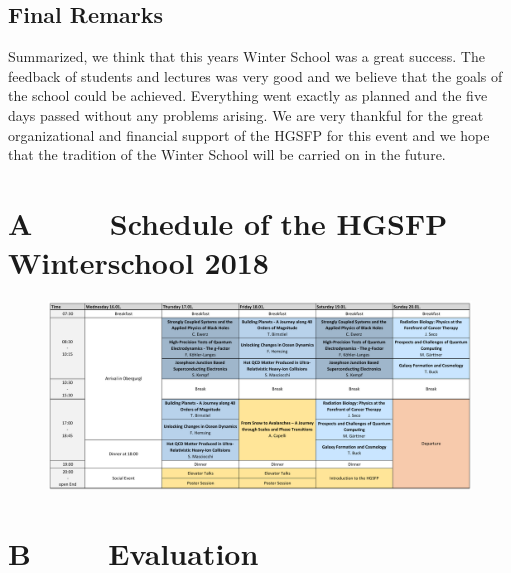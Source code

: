 \subsection*{Final Remarks}
Summarized, we think that this years Winter School was a great success.
The feedback of students and lectures was very good and we believe that
the goals of the school could be achieved. Everything went exactly as
planned and the five days passed without any problems arising. We are
very thankful for the great organizational and financial support of the
HGSFP for this event and we hope that the tradition of the Winter School
will be carried on in the future.


\newpage
\section*{A $\qquad$ Schedule of the HGSFP Winterschool 2018}

\begin{figure}[h!]
\centering
\includegraphics[scale=0.66, angle = 90 ]{figures/Program.jpg}
\end{figure}


\section*{B $\qquad$ Evaluation}

\newpage